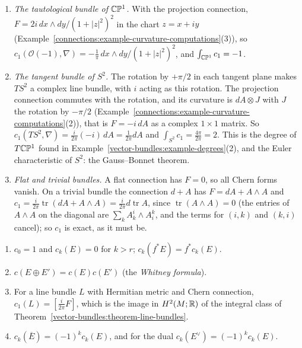 \begin{example}\label{characteristic-classes:example-chern-forms-sphere}
\begin{enumerate}
\item \emph{The tautological bundle of $\mathbb{C}\mathbb{P}^1$.} With the projection connection, $F = 2i\,dx \wedge dy/(1 + |z|^2)^2$ in the chart $z = x + iy$
(Example~\ref{connections:example-curvature-computations}(3)), so $c_1(\mathcal{O}(-1), \nabla) = -\frac1\pi\,dx \wedge dy/(1 + |z|^2)^2$, and $\int_{\mathbb{C}\mathbb{P}^1}c_1 = -1$.
\item \emph{The tangent bundle of $S^2$.} The rotation by $+\pi/2$ in each tangent plane makes $TS^2$ a complex line bundle, with $i$ acting as this rotation. The projection
connection commutes with the rotation, and its curvature is $dA \otimes J$ with $J$ the rotation by $-\pi/2$ (Example~\ref{connections:example-curvature-computations}(2)), that is
$F = -i\,dA$ as a complex $1 \times 1$ matrix. So $c_1(TS^2, \nabla) = \frac{i}{2\pi}(-i)\,dA = \frac{1}{2\pi}dA$ and $\int_{S^2}c_1 = \frac{4\pi}{2\pi} = 2$. This is the degree of
$T\mathbb{C}\mathbb{P}^1$ found in Example~\ref{vector-bundles:example-degrees}(2), and the Euler characteristic of $S^2$: the Gauss--Bonnet theorem.
\item \emph{Flat and trivial bundles.} A flat connection has $F = 0$, so all Chern forms vanish. On a trivial bundle the connection $d + A$ has $F = dA + A \wedge A$ and
$c_1 = \frac{i}{2\pi}\operatorname{tr}(dA + A \wedge A) = \frac{i}{2\pi}d\operatorname{tr}A$, since $\operatorname{tr}(A \wedge A) = 0$ (the entries of $A \wedge A$ on the diagonal are
$\sum_kA^i_k \wedge A^k_i$, and the terms for $(i, k)$ and $(k, i)$ cancel); so $c_1$ is exact, as it must be.
\end{enumerate}
\end{example}

\begin{proposition}\label{characteristic-classes:proposition-chern-properties}
\begin{enumerate}
\item $c_0 = 1$ and $c_k(E) = 0$ for $k > r$; $c_k(f^*E) = f^*c_k(E)$.
\item $c(E \oplus E') = c(E)c(E')$ (the \emph{Whitney formula}).
\item For a line bundle $L$ with Hermitian metric and Chern connection, $c_1(L) = [\frac{i}{2\pi}F]$, which is the image in $H^2(M; \mathbb{R})$ of the integral class of
Theorem~\ref{vector-bundles:theorem-line-bundles}.
\item $c_k(\overline{E}) = (-1)^kc_k(E)$, and for the dual $c_k(E^\vee) = (-1)^kc_k(E)$.
\end{enumerate}
\end{proposition}

